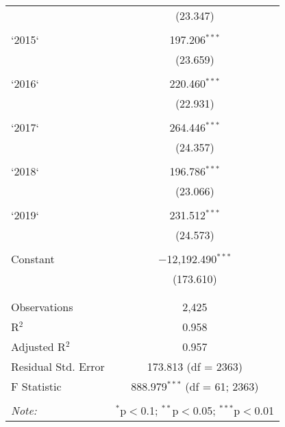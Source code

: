 \begin{table}[!htbp]
\begin{tabular}{@{\extracolsep{5pt}}lc}
  & (23.347) \\ 
  & \\ 
 `2015` & 197.206$^{***}$ \\ 
  & (23.659) \\ 
  & \\ 
 `2016` & 220.460$^{***}$ \\ 
  & (22.931) \\ 
  & \\ 
 `2017` & 264.446$^{***}$ \\ 
  & (24.357) \\ 
  & \\ 
 `2018` & 196.786$^{***}$ \\ 
  & (23.066) \\ 
  & \\ 
 `2019` & 231.512$^{***}$ \\ 
  & (24.573) \\ 
  & \\ 
 Constant & $-$12,192.490$^{***}$ \\ 
  & (173.610) \\ 
  & \\ 
\hline \\[-1.8ex] 
Observations & 2,425 \\ 
R$^{2}$ & 0.958 \\ 
Adjusted R$^{2}$ & 0.957 \\ 
Residual Std. Error & 173.813 (df = 2363) \\ 
F Statistic & 888.979$^{***}$ (df = 61; 2363) \\ 
\hline 
\hline \\[-1.8ex] 
\textit{Note:}  & \multicolumn{1}{r}{$^{*}$p$<$0.1; $^{**}$p$<$0.05; $^{***}$p$<$0.01} \\ 
\end{tabular} 
\end{table} 
